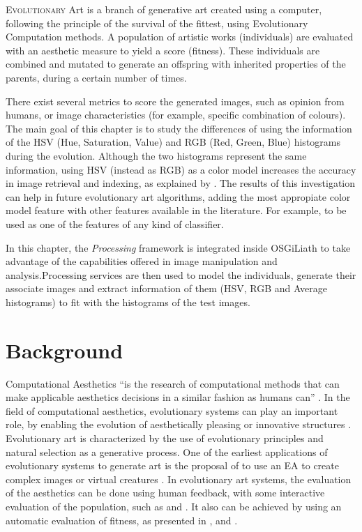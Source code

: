 \label{chap:art}
\minitoc\mtcskip
\vfill
\lettrine{E}{volutionary} Art \cite{EART} is a branch of generative art \cite{PHEROGRAPHY} created using a
computer, following the principle of the survival of the fittest, 
using Evolutionary Computation methods. A population
of artistic works (individuals) are evaluated with an aesthetic
measure to yield a score (fitness). These individuals are combined and
mutated to generate an offspring with inherited properties of the
parents, during a certain number of times. 

There exist several metrics to score the generated images, such as opinion from humans, or image characteristics (for example, specific combination of colours). The main goal of this chapter is to study the differences of using
the information of the HSV (Hue, Saturation, Value) and RGB (Red,
Green, Blue) histograms during the evolution. Although the two histograms represent the same information, using HSV (instead as RGB) as a color model increases the accuracy in image retrieval and indexing, as explained by  \cite{COLORDIFFERENCES}. The results of this investigation can help in future evolutionary art algorithms, adding the most appropiate color model feature with other features available in the literature. For example, to be used as one of the features of any kind of classifier.

In this chapter, the {\em Processing} \cite{PROCESSING} framework is integrated inside OSGiLiath to take advantage of the capabilities offered in image manipulation and analysis.Processing services are then used 
 to model the
individuals, generate their associate images and extract information
of them (HSV, RGB and Average histograms) to fit with the histograms
of the test images.



\section{Background}

\noindent Computational Aesthetics ``is the research of computational methods that can make applicable aesthetics decisions in a similar fashion as humans can'' \cite{COMPAESTH}. In the field of computational aesthetics, evolutionary systems can play an important role, by enabling the evolution of aesthetically pleasing or innovative structures \cite{dipaola2009incorporating}. Evolutionary art is characterized by the use of evolutionary principles and natural selection as a generative process. One of the earliest applications of evolutionary systems to generate art is the proposal of  to use an EA to create complex images \cite{sims1991artificial} or virtual creatures  \cite{sims1994evolving}. In evolutionary art systems, the evaluation of the aesthetics can be done using human feedback, with some interactive evaluation of the population, such as \cite{ashlock2006evolutionary,draves2006electric,moroni2000vox} and \cite{sims1991artificial}. It also can be achieved by using an automatic evaluation of fitness, as presented in \cite{aguilar2008robotic,den2010comparing,dipaola2009incorporating,li2012investigating}, and \cite{sims1994evolving}.

